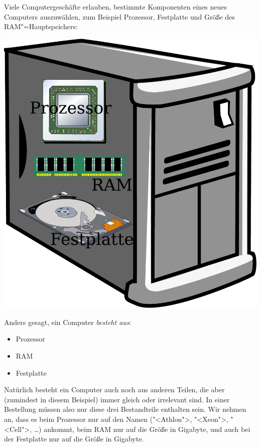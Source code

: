 %
Viele Computergeschäfte erlauben, bestimmte Komponenten
eines neues Computers auszuwählen, zum Beispiel Prozessor,
Festplatte und Größe des RAM"=Hauptspeichers:
%
\begin{center}
  \medskip
  \includegraphics[height=0.25\textheight]{zusammengesetzte-daten/computer}
  \medskip
\end{center}
%
Anders gesagt, ein Computer \emph{besteht aus}:
%
\begin{itemize}
\item Prozessor
\item RAM
\item Festplatte
\end{itemize}
%
Natürlich besteht ein Computer auch noch aus anderen Teilen, die
aber (zumindest in diesem Beispiel) immer gleich oder irrelevant sind.
In einer Bestellung müssen also nur diese drei Bestandteile
enthalten sein.  Wir nehmen an, dass es beim Prozessor nur auf den Namen
("<Athlon">, "<Xeon">, "<Cell">, \ldots) ankommt, beim RAM nur auf die
Größe in Gigabyte, und auch bei der Festplatte nur auf die Größe in
Gigabyte.

